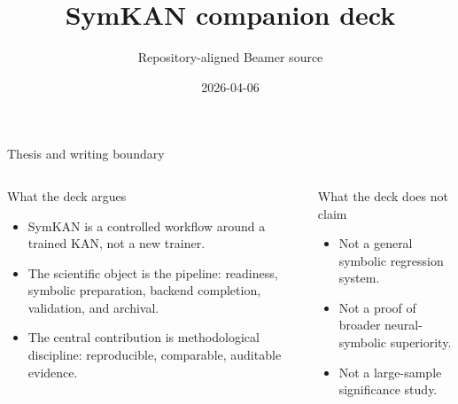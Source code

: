 \documentclass[aspectratio=169,10pt]{beamer}
\title[SymKAN companion deck]{SymKAN companion deck}
\author{Repository-aligned Beamer source}
\date{2026-04-06}
\begin{document}

\begin{frame}{Thesis and writing boundary}
  \begin{columns}[T,onlytextwidth]
      \begin{block}{What the deck argues}
        \begin{itemize}
          \item SymKAN is a controlled workflow around a trained KAN, not a new trainer.
          \item The scientific object is the pipeline: readiness, symbolic preparation, backend completion, validation, and archival.
          \item The central contribution is methodological discipline: reproducible, comparable, auditable evidence.
        \end{itemize}
      \end{block}
      \begin{block}{What the deck does not claim}
        \begin{itemize}
          \item Not a general symbolic regression system.
          \item Not a proof of broader neural-symbolic superiority.
          \item Not a large-sample significance study.
        \end{itemize}
      \end{block}
  \end{columns}
\end{frame}
\end{document}
